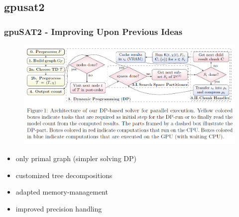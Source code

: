 \documentclass[c,8pt,xcolor...,x11names]{beamer}
\begin{document}
\subsection{gpusat2}
\begin{frame}
	\frametitle{gpuSAT2 - Improving Upon Previous Ideas }
	\begin{figure}
		\includegraphics[height=0.3\textheight]{images/gpusat2DP.png}
	\end{figure}
	\begin{minipage}{0.49\textwidth}
		\begin{itemize}

			\item only primal graph { \small (simpler solving DP)}
			\item customized tree decompositions
			\item adapted memory-management
			\item improved precision handling


\end{itemize}
\end{minipage}
\end{frame}
\end{document}
